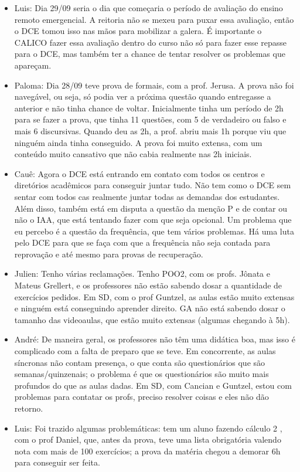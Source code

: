 \documentclass{ata-calico}
\begin{document}
\begin{itemize}
\item Luis: Dia 29/09 seria o dia que começaria o período de avaliação do ensino remoto emergencial. A reitoria não se mexeu para puxar essa avaliação, então o DCE tomou isso nas mãos para mobilizar a galera. É importante o CALICO fazer essa avaliação dentro do curso não só para fazer esse repasse para o DCE, mas também ter a chance de tentar resolver os problemas que apareçam.
\item Paloma: Dia 28/09 teve prova de formais, com a prof. Jerusa. A prova não foi navegável, ou seja, só podia ver a próxima questão quando entregasse a anterior e não tinha chance de voltar. Inicialmente tinha um período de 2h para se fazer a prova, que tinha 11 questões, com 5 de verdadeiro ou falso e mais 6 discursivas. Quando deu as 2h, a prof. abriu mais 1h porque viu que ninguém ainda tinha conseguido. A prova foi muito extensa, com um conteúdo muito cansativo que não cabia realmente nas 2h iniciais.
\item Cauê: Agora o DCE está entrando em contato com todos os centros e diretórios acadêmicos para conseguir juntar tudo. Não tem como o DCE sem sentar com todos cas realmente juntar todas as demandas dos estudantes. Além disso, também está em disputa a questão da menção P e de contar ou não o IAA, que está tentando fazer com que seja opcional. Um problema que eu percebo é a questão da frequência, que tem vários problemas. Há uma luta pelo DCE para que se faça com que a frequência não seja contada para reprovação e até mesmo para provas de recuperação.
\item Julien: Tenho várias reclamações. Tenho POO2, com os profs. Jônata e Mateus Grellert, e os professores não estão sabendo dosar a quantidade de exercícios pedidos. Em SD, com o prof Guntzel, as aulas estão muito extensas e ninguém está conseguindo aprender direito. GA não está sabendo dosar o tamanho das videoaulas, que estão muito extensas (algumas chegando à 5h).
\item André: De maneira geral, os professores não têm uma didática boa, mas isso é complicado com a falta de preparo que se teve. Em concorrente, as aulas síncronas não contam presença, o que conta são questionários que são semanas/quinzenais; o problema é que os questionários são muito mais profundos do que as aulas dadas. Em SD, com Cancian e Guntzel, estou com problemas para contatar os profs, preciso resolver coisas e eles não dão retorno.
\item Luis: Foi trazido algumas problemáticas: tem um aluno fazendo cálculo 2 , com o prof Daniel, que, antes da prova, teve uma lista obrigatória valendo nota com mais de 100 exercícios; a prova da matéria chegou a demorar 6h para conseguir ser feita.

\end{itemize}
\end{document}
